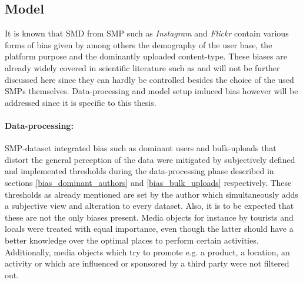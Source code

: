 \subsection*{Model}
It is known that SMD from SMP such as \textit{Instagram} and \textit{Flickr} contain various forms of bias given by among others the demography of the user base, the platform purpose and the dominantly uploaded content-type. These biases are already widely covered in scientific literature such as \parencite{} and will not be further discussed here since they can hardly be controlled besides the choice of the used SMPs themselves. Data-processing and model setup induced bias however will be addressed since it is specific to this thesis. \\

\paragraph*{Data-processing:} SMP-dataset integrated bias such as dominant users and bulk-uploads that distort the general perception of the data were mitigated by subjectively defined and implemented thresholds during the data-processing phase described in sections \ref{bias_dominant_authors} and \ref{bias_bulk_uploads} respectively. These thresholds as already mentioned are set by the author which simultaneously adds a subjective view and alteration to every dataset. Also, it is to be expected that these are not the only biases present. Media objects for instance by tourists and locals were treated with equal importance, even though the latter should have a better knowledge over the optimal places to perform certain activities. Additionally, media objects which try to promote e.g. a product, a location, an activity or which are influenced or sponsored by a third party were not filtered out.\\
